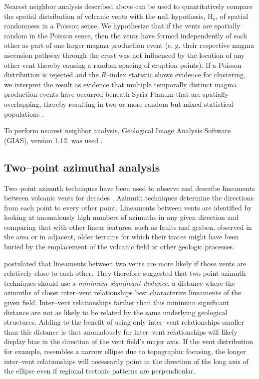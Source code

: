 \documentclass[preprint,review,authoryear,12pt]{elsarticle}
\begin{document}
Nearest neighbor analysis described above can be used to quantitatively compare the spatial distribution of volcanic vents with the null hypothesis, H$_o$, of spatial randomness in a Poisson sense. We hypothesize that if the vents are spatially random in the Poisson sense, then the vents have formed independently of each other as part of one larger magma production event (e. g. their respective magma ascension pathway through the crust was not influenced by the location of any other vent thereby causing a random spacing of eruption points). If a Poisson distribution is rejected and the $R$--index statistic shows evidence for clustering, we interpret the result as evidence that multiple temporally distinct magma production events have occurred beneath Syria Planum that are spatially overlapping, thereby resulting in two or more random but mixed statistical populations \citep{Lutz1986,Lutz1995}.

To perform nearest neighbor analysis, Geological Image Analysis Software (GIAS), version 1.12, was used \citep{Beggan2010,Hamilton2010,Hamilton2011}.

\subsection{Two--point azimuthal analysis}
\label{sec:methodAzimuth}

Two--point azimuth techniques have been used to observe and describe lineaments between volcanic vents for decades \citep{Lutz1986,Wadge1988,Wadge1989,Connor1990,Lutz1995,Bleacher2009,Cebria2011,Roberts2011}. Azimuth techniques determine the directions from each point to every other point. Lineaments between vents are identified by looking at anomalously high numbers of azimuths in any given direction and comparing that with other linear features, such as faults and graben, observed in the area or in adjacent, older terrains for which their traces might have been buried by the emplacement of the volcanic field or other geologic processes.

\citet{Cebria2011} postulated that lineaments between two vents are more likely if those vents are relatively close to each other. They therefore suggested that two point azimuth techniques should use a \textit{minimum significant distance}, a distance where the azimuths of closer inter--vent relationships best characterize lineaments of the given field. Inter--vent relationships farther than this minimum significant distance are not as likely to be related by the same underlying geological structures. Adding to the benefit of using only inter--vent relationships smaller than this distance is that anomalously far inter--vent relationships will likely display bias in the direction of the vent field's major axis. If the vent distribution for example, resembles a narrow ellipse due to topographic focusing, the longer inter--vent relationships will necessarily point in the direction of the long axis of the ellipse even if regional tectonic patterns are perpendicular.
\end{document}
